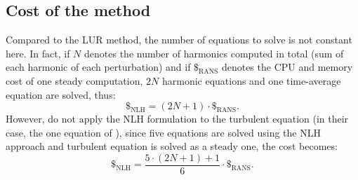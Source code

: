 \subsection{Cost of the method}
Compared to the LUR method, the number of equations to solve is 
not constant here. In fact, if $N$ denotes the number of harmonics
computed in total (sum of each harmonic of each perturbation)
and if $\mathdollar_{\text{RANS}}$ 
denotes the CPU and memory cost of
one steady computation, $2N$ harmonic equations and 
one time-average equation
are solved, thus:
\begin{equation}
	\mathdollar_{\text{NLH}} = (2N+1) \cdot \mathdollar_{\text{RANS}}.
\end{equation}
However, \citet{Vilmin2006} do not apply the NLH formulation
to the turbulent equation (in their case, 
the one equation of \citet{Spalart1992}),
since five equations are solved using the NLH approach and turbulent equation
is solved as a steady one,
the cost becomes:
\begin{equation}
	\mathdollar_{\text{NLH}} = \frac{5 \cdot (2N+1) + 1}{6} \cdot \mathdollar_{\text{RANS}}.
\end{equation}

